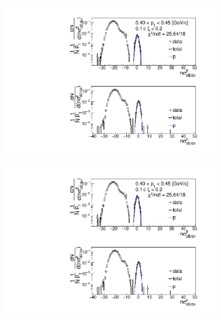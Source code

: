 \begin{figure}[h!]
\begin{subfigure}{.32\textwidth}
	\end{subfigure}
	\begin{subfigure}{.32\textwidth}
		\includegraphics[width=\linewidth, page=4]{chapters/chrgSTAR/img/dEdx/fit2019_thirdStep_2_2.pdf}
	\end{subfigure}
	\begin{subfigure}{.32\textwidth}
		\includegraphics[width=\linewidth, page=5]{chapters/chrgSTAR/img/dEdx/fit2019_thirdStep_2_2.pdf}
	\end{subfigure}
	\begin{subfigure}{.32\textwidth}

\end{subfigure}
\end{figure}

